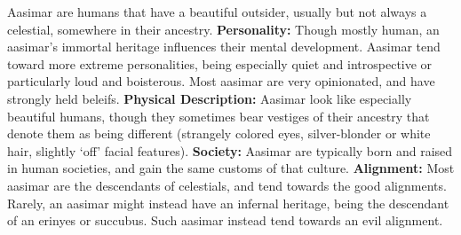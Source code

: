 \begin{multicols}{2}
Aasimar are humans that have a beautiful outsider, usually but not always a celestial, somewhere in their ancestry. \linebreak
\indent\textbf{Personality: }Though mostly human, an aasimar's immortal heritage influences their mental development. Aasimar tend toward more extreme personalities, being especially quiet and introspective or particularly loud and boisterous. Most aasimar are very opinionated, and have strongly held beleifs.\linebreak
\indent\textbf{Physical Description: }Aasimar look like especially beautiful humans, though they sometimes bear vestiges of their ancestry that denote them as being different (strangely colored eyes, silver-blonder or white hair, slightly `off' facial features).\linebreak
\indent\textbf{Society: }Aasimar are typically born and raised in human societies, and gain the same customs of that culture.\linebreak
\indent\textbf{Alignment: }Most aasimar are the descendants of celestials, and tend towards the good alignments. Rarely, an aasimar might instead have an infernal heritage, being the descendant of an erinyes or succubus. Such aasimar instead tend towards an evil alignment.\linebreak

\columnbreak

\begin{racetable}
\standardsenses
{}
\end{racetable}

\vspace{\baselineskip}

\vspace{\baselineskip}
\begin{heightweighttable}
\end{heightweighttable}
\end{multicols}